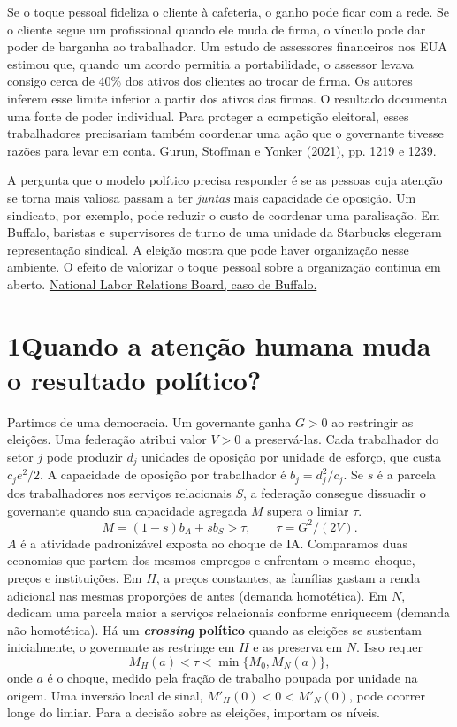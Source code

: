 \documentclass[11pt,a4paper]{article}
\newcommand{\titulo}[1]{\section*{\color{tinta}#1}}
\newcommand{\subtitulo}[1]{\par\smallskip{\large\bfseries\color{azul}#1\par}\nobreak}
\begin{document}
\subtitulo{Quem se apropria do valor da relação?}
Se o toque pessoal fideliza o cliente à cafeteria, o ganho pode ficar com a rede. Se o cliente segue um profissional quando ele muda de firma, o vínculo pode dar poder de barganha ao trabalhador. Um estudo de assessores financeiros nos EUA estimou que, quando um acordo permitia a portabilidade, o assessor levava consigo cerca de 40\% dos ativos dos clientes ao trocar de firma. Os autores inferem esse limite inferior a partir dos ativos das firmas. O resultado documenta uma fonte de poder individual. Para proteger a competição eleitoral, esses trabalhadores precisariam também coordenar uma ação que o governante tivesse razões para levar em conta. \href{https://doi.org/10.1016/j.jfineco.2021.04.026}{Gurun, Stoffman e Yonker (2021), pp. 1219 e 1239.}

A pergunta que o modelo político precisa responder é se as pessoas cuja atenção se torna mais valiosa passam a ter \emph{juntas} mais capacidade de oposição. Um sindicato, por exemplo, pode reduzir o custo de coordenar uma paralisação. Em Buffalo, baristas e supervisores de turno de uma unidade da Starbucks elegeram representação sindical. A eleição mostra que pode haver organização nesse ambiente. O efeito de valorizar o toque pessoal sobre a organização continua em aberto. \href{https://www.nlrb.gov/case/03-RC-282115}{National Labor Relations Board, caso de Buffalo.}

\newpage
\titulo{1\quad Quando a atenção humana muda o resultado político?}
Partimos de uma democracia. Um governante ganha \(G>0\) ao restringir as eleições. Uma federação atribui valor \(V>0\) a preservá-las. Cada trabalhador do setor \(j\) pode produzir \(d_j\) unidades de oposição por unidade de esforço, que custa \(c_je^2/2\). A capacidade de oposição por trabalhador é \(b_j=d_j^2/c_j\). Se \(s\) é a parcela dos trabalhadores nos serviços relacionais \(S\), a federação consegue dissuadir o governante quando sua capacidade agregada \(M\) supera o limiar \(\tau\).
\[
 M=(1-s)b_A+s b_S > \tau,\qquad \tau=G^2/(2V).
\]
\(A\) é a atividade padronizável exposta ao choque de IA. Comparamos duas economias que partem dos mesmos empregos e enfrentam o mesmo choque, preços e instituições. Em \(H\), a preços constantes, as famílias gastam a renda adicional nas mesmas proporções de antes (demanda homotética). Em \(N\), dedicam uma parcela maior a serviços relacionais conforme enriquecem (demanda não homotética). Há um \textbf{\emph{crossing} político} quando as eleições se sustentam inicialmente, o governante as restringe em \(H\) e as preserva em \(N\). Isso requer
\[
 M_H(a)<\tau<\min\{M_0,M_N(a)\},
\]
onde \(a\) é o choque, medido pela fração de trabalho poupada por unidade na origem. Uma inversão local de sinal, \(M'_H(0)<0<M'_N(0)\), pode ocorrer longe do limiar. Para a decisão sobre as eleições, importam os níveis.
\end{document}
